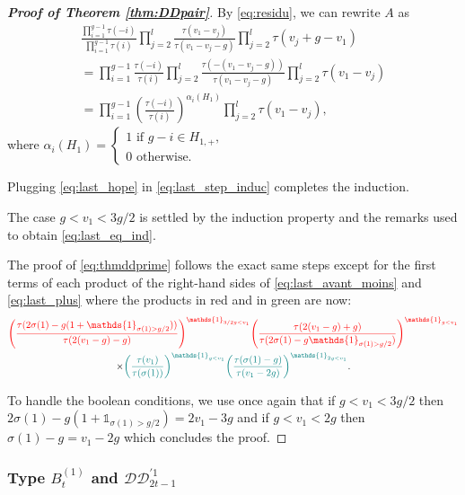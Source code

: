 \documentclass[11pt,letterpaper]{amsart}
\def\ccdd{\mathcal {DD}}
\numberwithin{equation}{section}
\numberwithin{df}{section}
\begin{document}
\begin{proof}[\textbf{Proof of Theorem \ref{thm:DDpair}}]
By \eqref{eq:residu}, we can rewrite $A$ as
\begin{multline}\label{eq:last_step_induc}
\frac{\prod_{i=1}^{g-1}\tau(-i)}{\prod_{i=1}^{g-1}\tau(i)} \prod_{j=2}^l\frac{\tau(v_1-v_j)}{\tau(v_1-v_j-g)} \prod_{j=2}^l\tau(v_j+g-v_1) \\=\prod_{i=1}^{g-1}\frac{\tau(-i)}{\tau(i)} \prod_{j=2}^l\frac{\tau(-(v_1-v_j-g))}{\tau(v_1-v_j-g)} \prod_{j=2}^l\tau(v_1-v_j)\\
=\prod_{i=1}^{g-1}\left(\frac{\tau(-i)}{\tau(i)}\right)^{\alpha_i(H_1)}\prod_{j=2}^l\tau(v_1-v_j),
\end{multline}
where $\alpha_i(H_1)=\begin{cases} 1 \text{ if } g-i \in H_{1,+},\\
0 \text{ otherwise.}
\end{cases}$

Plugging \eqref{eq:last_hope} in \eqref{eq:last_step_induc} completes the induction.

The case $g<v_1<3g/2$ is settled by the induction property and the remarks used to obtain \eqref{eq:last_eq_ind}.

The proof of \eqref{eq:thmddprime} follows the exact same steps except for the first terms of each product of the right-hand sides of \eqref{eq:last_avant_moins} and \eqref{eq:last_plus} where the products in red and in green are now:
\begin{multline}\label{eq:interprime}
\textcolor{red}{\left(\frac{\tau(2\sigma(1)-g(1+\mathds{1}_{\sigma(1)>g/2}))}{\tau(2(v_1-g)-g)}\right)^{\mathds{1}_{3/2g<v_1}}}
 \textcolor{red}{\left(\frac{\tau(2(v_1-g)+g)}{\tau(2\sigma(1)-g\mathds{1}_{\sigma(1)>g/2})}\right)^{\mathds{1}_{g<v_1}}}\\
 \times  \textcolor{teal}{\left(\frac{\tau(v_1)}{\tau(\sigma(1))}\right)^{\mathds{1}_{g<v_1}}}\textcolor{teal}{\left(\frac{\tau(\sigma(1)-g)}{\tau(v_1-2g)}\right)^{\mathds{1}_{2g<v_1}}}.
\end{multline}

To handle the boolean conditions, we use once again that if $g<v_1<3g/2$ then $2\sigma(1)-g(1+\mathds{1}_{\sigma(1)>g/2})=2v_1-3g$ and if $g<v_1<2g$ then $\sigma(1)-g=v_1-2g$ which concludes the proof.
\end{proof}



\subsubsection{Type $B^{(1)}_{t}$ and $\ccdd_{2t-1}^{'1}$}
\end{document}
